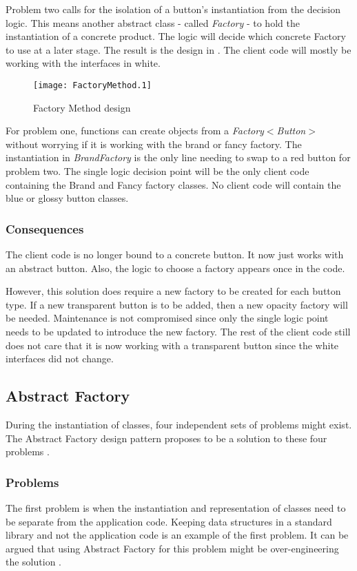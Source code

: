 Problem two calls for the isolation of a button's instantiation from the decision logic.
This means another abstract class - called \textit{Factory} - to hold the instantiation of a concrete product.
The logic will decide which concrete Factory to use at a later stage.
The result is the design in .
The client code will mostly be working with the interfaces in white.

\begin{figure}[h]
	\centering
	\texttt{[image: FactoryMethod.1]}
	\caption{Factory Method design}
	\label{fig:FactoryMethod}
\end{figure}

For problem one, functions can create objects from a \textit{Factory$<$Button$>$} without worrying if it is working with the brand or fancy factory.
The instantiation in \textit{BrandFactory} is the only line needing to swap to a red button for problem two.
The single logic decision point will be the only client code containing the Brand and Fancy factory classes.
No client code will contain the blue or glossy button classes.

\subsubsection{Consequences}
The client code is no longer bound to a concrete button.
It now just works with an abstract button.
Also, the logic to choose a factory appears once in the code.

However, this solution does require a new factory to be created for each button type.
If a new transparent button is to be added, then a new opacity factory will be needed.
Maintenance is not compromised since only the single logic point needs to be updated to introduce the new factory.
The rest of the client code still does not care that it is now working with a transparent button since the white interfaces did not change.

\subsection{Abstract Factory}
During the instantiation of classes, four independent sets of problems might exist.
The Abstract Factory design pattern proposes to be a solution to these four problems \cite{gamma_94_01}.

\subsubsection{Problems}
The first problem is when the instantiation and representation of classes need to be separate from the application code.
Keeping data structures in a standard library and not the application code is an example of the first problem.
It can be argued that using Abstract Factory for this problem might be over-engineering the solution \cite{kerievsky_05_01}.

